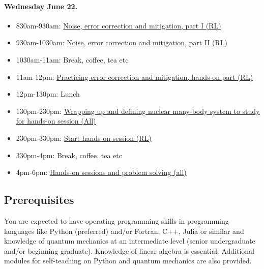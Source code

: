 \documentclass[%
oneside,                 %
final,                   %
10pt]{article}
\begin{document}
\paragraph{Wednesday June 22.}
\begin{itemize}
\item 830am-930am: \href{{https://nuclearphysicsworkshops.github.io/FRIB-TASummerSchoolQuantumComputing/doc/web/course.html}}{Noise, error correction and mitigation, part I (RL)}

\item 930am-1030am: \href{{https://nuclearphysicsworkshops.github.io/FRIB-TASummerSchoolQuantumComputing/doc/web/course.html}}{Noise, error correction and mitigation, part II (RL)}

\item 1030am-11am: Break, coffee, tea etc

\item 11am-12pm: \href{{https://nuclearphysicsworkshops.github.io/FRIB-TASummerSchoolQuantumComputing/doc/web/course.html}}{Practicing error correction and mitigation, hands-on part (RL)}

\item 12pm-130pm: Lunch

\item 130pm-230pm: \href{{https://nuclearphysicsworkshops.github.io/FRIB-TASummerSchoolQuantumComputing/doc/web/course.html}}{Wrapping up and defining nuclear many-body system to study for hands-on session (All)}

\item 230pm-330pm: \href{{https://nuclearphysicsworkshops.github.io/FRIB-TASummerSchoolQuantumComputing/doc/web/course.html}}{Start hands-on session (RL)}

\item 330pm-4pm: Break, coffee, tea etc

\item 4pm-6pm: \href{{https://nuclearphysicsworkshops.github.io/FRIB-TASummerSchoolQuantumComputing/doc/web/course.html}}{Hands-on sessions and problem solving (all)}
\end{itemize}

\noindent
\subsection{Prerequisites}

You are expected to have operating programming skills in programming
languages like Python (preferred) and/or Fortran, C++, Julia or
similar and knowledge of quantum mechanics at an intermediate level
(senior undergraduate and/or beginning graduate). Knowledge of linear
algebra is essential.  Additional modules for self-teaching on Python
and quantum mechanics are also provided. 
\end{document}
